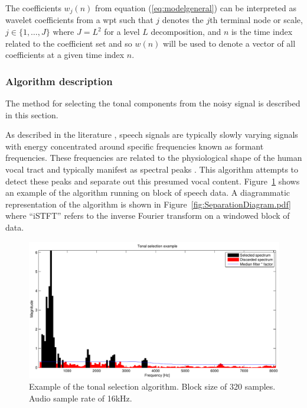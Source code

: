 The coefficients $w_{j}(n)$ from equation (\ref{eq:modelgeneral}) can be interpreted as wavelet coefficients from a \gls{wpt} such that $j$ denotes the $j$th terminal node or scale, $j \in \{1, \ldots, J\}$ where $J = L^2$ for a level $L$ decomposition, and $n$ is the time index related to the coefficient set and so $w(n)$ will be used to denote a vector of all coefficients at a given time index $n$. %

\subsubsection{Algorithm description}\label{sec:WPdetectionSep}
The method for selecting the tonal components from the noisy signal is described in this section.

As described in the literature \cite{Vaseghi1988thesis}\cite{Vaseghi1990}, speech signals are typically slowly varying signals with energy concentrated around specific frequencies known as formant frequencies. These frequencies are related to the physiological shape of the human vocal tract and typically manifest as spectral peaks \cite{Fant1970}. This algorithm attempts to detect these peaks and separate out this presumed vocal content. Figure~\ref{fig:Separation_Spectrum_Selection.pdf} shows an example of the algorithm running on block of speech data. A diagrammatic representation of the algorithm is shown in Figure~\ref{fig:SeparationDiagram.pdf} where ``iSTFT'' refers to the inverse Fourier transform on a windowed block of data.

\begin{figure} %
\begin{minipage}[b]{1.0\linewidth}
  \centering
  \centerline{\includegraphics[width=14cm]{Separation_Spectrum_Selection.pdf}}
\end{minipage}
\caption{Example of the tonal selection algorithm. Block size of 320 samples. Audio sample rate of 16kHz.}
\label{fig:Separation_Spectrum_Selection.pdf}
\end{figure}

